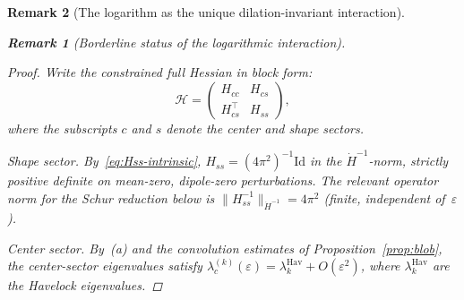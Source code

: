 \documentclass[12pt, a4paper]{article}
\newtheorem{remark}{Remark}[section]
\numberwithin{equation}{section}
\begin{document}
\begin{remark}[The logarithm as the unique dilation-invariant interaction]
\begin{remark}[Borderline status of the logarithmic interaction]
\begin{proof}
Write the constrained full Hessian in block form:
\[
  \mathcal{H} = \begin{pmatrix} H_{cc} & H_{cs} \\ H_{cs}^\top & H_{ss} \end{pmatrix},
\]
where the subscripts $c$ and $s$ denote the center and shape sectors.

\emph{Shape sector.}  By~\eqref{eq:Hss-intrinsic},
$H_{ss} = (4\pi^2)^{-1}\mathrm{Id}$ in the $\dot H^{-1}$-norm, strictly
positive definite on mean-zero, dipole-zero perturbations.
The relevant operator norm for the Schur reduction below is
$\|H_{ss}^{-1}\|_{\dot H^{-1}} = 4\pi^2$ (finite, independent
of~$\varepsilon$).

\emph{Center sector.}  By~(a) and the convolution estimates of
Proposition~\ref{prop:blob}, the center-sector eigenvalues satisfy
$\lambda_c^{(k)}(\varepsilon) = \lambda_k^{\mathrm{Hav}} + O(\varepsilon^2)$,
where $\lambda_k^{\mathrm{Hav}}$ are the Havelock eigenvalues.


\end{proof}
\end{remark}
\end{remark}
\end{document}
